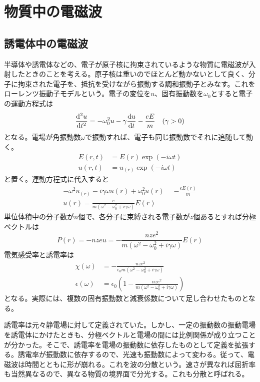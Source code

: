 \section{物質中の電磁波}

\subsection{誘電体中の電磁波}
    半導体や誘電体などの、電子が原子核に拘束されているような物質に電磁波が入射したときのことを考える。原子核は重いのでほとんど動かないとして良く、分子に拘束された電子を、抵抗を受けながら振動する調和振動子とみなす。これをローレンツ振動子モデルという。電子の変位を$u$、固有振動数を$\omega_0$とすると電子の運動方程式は
        \[\dv[2]{u}{t} = - \omega_0^2 u - \gamma\dv{u}{t} -\frac{eE}{m} \quad (\gamma > 0)\]
    となる。電場が角振動数$\omega$で振動すれば、電子も同じ振動数でそれに追随して動く。
    \begin{align*}
        E(r, t) &= E(r)\exp(-i\omega t)\\
        u(r, t) &= u_(r)\exp(-i\omega t)
    \end{align*}
    と置く。運動方程式に代入すると
    \begin{gather*}
        -\omega^2 u_(r) - i\gamma\omega u(r) + \omega_0^2 u(r) = -\frac{eE(r)}{m}\\
        u(r) = \frac{e}{m(\omega^2 - \omega_0^2 + i\gamma\omega)}E(r)
    \end{gather*}
    単位体積中の分子数が$n$個で、各分子に束縛される電子数が$z$個あるとすれば分極ベクトルは
        \[P(r) = -nzeu = -\frac{nze^2}{m(\omega^2 - \omega_0^2 + i\gamma\omega)}E(r)\]
    電気感受率と誘電率は
    \begin{align*}
        \chi(\omega) &= -\frac{nze^2}{\epsilon_0m(\omega^2 - \omega_0^2 + i\gamma\omega)}\\
        \epsilon(\omega) &= \epsilon_0\left(1 - \frac{nze^2}{m(\omega^2 - \omega_0^2 + i\gamma\omega)}\right)
    \end{align*}
    となる。実際には、複数の固有振動数と減衰係数について足し合わせたものとなる。
    
    誘電率は元々静電場に対して定義されていた。しかし、一定の振動数の振動電場を誘電体にかけたときも、分極ベクトルと電場の間には比例関係が成り立つことが分かった。そこで、誘電率を電場の振動数に依存したものとして定義を拡張する。誘電率が振動数に依存するので、光速も振動数によって変わる。従って、電磁波は時間とともに形が崩れる。これを波の分散という。速さが異なれば屈折率も当然異なるので、異なる物質の境界面で分光する。これも分散と呼ばれる。
    
